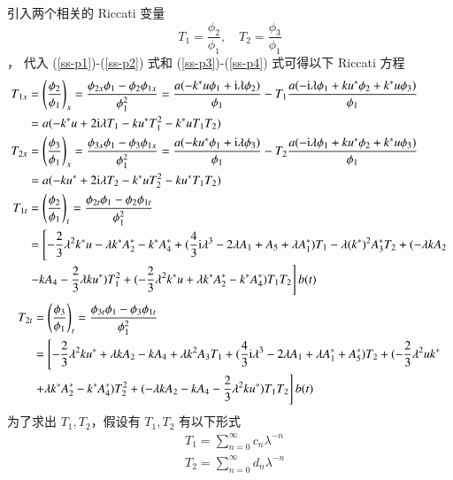引入两个相关的 Riccati 变量
\begin{equation}
  T_{1} = \frac{\phi_{2}}{\phi_{1}}, \quad T_{2} = \frac{\phi_{3}}{\phi_{1}}
\end{equation}，
代入 (\ref{ss-p1})-(\ref{ss-p2}) 式和 (\ref{ss-p3})-(\ref{ss-p4}) 式可得以下 Riccati 方程
\begin{align}
  T_{1x} &= \left(\frac{\phi_2}{\phi_1}\right)_x=\frac{\phi_{2x}\phi_1-\phi_2\phi_{1x}}{\phi_1^2}=\frac{a(-k^*u\phi_1+\mathrm{i}\lambda\phi_2)}{\phi_1}-T_1\frac{a(-\mathrm{i}\lambda\phi_1+ku^*\phi_2+k^*u\phi_3)}{\phi_1}\nonumber\\
  &= a(-k^{*}u + 2\mathrm{i}\lambda T_{1} - ku^{*}T_{1}^{2} - k^{*}uT_{1}T_{2}) \label{ss-t1x} \\
  T_{2x} &=\left(\frac{\phi_3}{\phi_1}\right)_x=\frac{\phi_{3x}\phi_1-\phi_3\phi_{1x}}{\phi_1^2}=\frac{a(-ku^*\phi_1+\mathrm{i}\lambda\phi_3)}{\phi_1}-T_2\frac{a(-\mathrm{i}\lambda\phi_1+ku^*\phi_2+k^*u\phi_3)}{\phi_1}\nonumber\\
  &= a(-ku^{*} + 2\mathrm{i}\lambda T_{2} - k^{*}uT_{2}^{2} - ku^{*}T_{1}T_{2}) \label{ss-t2x} \\
  T_{1t} &=\left(\frac{\phi_2}{\phi_1}\right)_t=\frac{\phi_{2t}\phi_1-\phi_2\phi_{1t}}{\phi_1^2}\nonumber\\
  &= \left[-\frac{2}{3}\lambda^{2}k^{*}u - \lambda k^{*}A_{2}^{*} - k^{*}A_{4}^{*} + (\frac{4}{3}\mathrm{i}\lambda^{3}-2\lambda A_{1}+A_{5}+\lambda A_{1}^{*})T_{1} - \lambda (k^{*})^{2}A_{3}^{*}T_{2} + (-\lambda kA_{2} \right.\notag\\
  & \left. - kA_{4} - \frac{2}{3}\lambda ku^{*})T_{1}^{2} + (-\frac{2}{3}\lambda^{2}k^{*}u+\lambda k^{*}A_{2}^{*}-k^{*}A_{4}^{*})T_{1}T_{2} \right]b(t)
\end{align}
\begin{align}
  T_{2t} &=\left(\frac{\phi_3}{\phi_1}\right)_t=\frac{\phi_{3t}\phi_1-\phi_3\phi_{1t}}{\phi_1^2}\nonumber\\
  &= \left[-\frac{2}{3}\lambda^{2}ku^{*} + \lambda kA_{2} - kA_{4} + \lambda k^{2}A_{3}T_{1} + (\frac{4}{3}\mathrm{i}\lambda^{3}-2\lambda A_{1}+\lambda A_{1}^{*}+A_{5}^{*})T_{2} + (-\frac{2}{3}\lambda^{2}uk^{*} \right. \notag\\
  & \left. +\lambda k^{*}A_{2}^{*}-k^{*}A_{4}^{*})T_{2}^{2} + (-\lambda kA_{2}-kA_{4}-\frac{2}{3}\lambda^{2}ku^{*})T_{1}T_{2} \right]b(t)
\end{align}
为了求出 $T_1, T_2$，假设有 $T_{1}, T_{2}$ 有以下形式
\begin{align}
  & T_{1} = \sum_{n=0}^{\infty}c_{n}\lambda^{-n} \label{ss-t1}\\
  & T_{2} = \sum_{n=0}^{\infty}d_{n}\lambda^{-n} \label{ss-t2}
\end{align}
